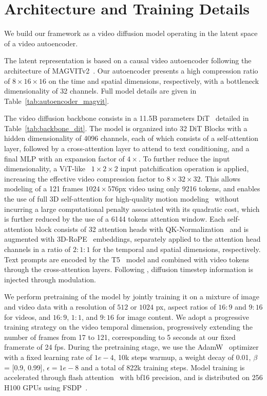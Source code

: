 \section{Architecture and Training Details}

We build our framework as a video diffusion model operating in the latent space of a video autoencoder.

The latent representation is based on a causal video autoencoder following the architecture of MAGVITv2~\cite{yu2024language}. Our autoencoder presents a high compression ratio of $8\times16\times16$ on the time and spatial dimensions, respectively, with a bottleneck dimensionality of 32 channels. Full model details are given in Table~\ref{tab:autoencoder_magvit}.

The video diffusion backbone consists in a 11.5B parameters DiT~\cite{Peebles2023DiT} detailed in Table~\ref{tab:backbone_dit}. The model is organized into 32 DiT Blocks with a hidden dimensionality of 4096 channels, each of which consists of a self-attention layer, followed by a cross-attention layer to attend to text conditioning, and a final MLP with an expansion factor of $4\times$. To further reduce the input dimensionality, a ViT-like~\cite{Dosovitskiy2021ViT} $1\times2\times2$ input patchification operation is applied, increasing the effective video compression factor to $8\times32\times32$. This allows modeling of a 121 frames $1024\times576$px video using only 9216 tokens, and enables the use of full 3D self-attention for high-quality motion modeling~\cite{polyak2024movie} without incurring a large computational penalty associated with its quadratic cost, which is further reduced by the use of a 6144 tokens attention window. Each self-attention block consists of 32 attention heads with QK-Normalization~\cite{EsserKSD3} and is augmented with 3D-RoPE~\cite{su2024roformer} embeddings, separately applied to the attention head channels in a ratio of $2:1:1$ for the temporal and spatial dimensions, respectively. Text prompts are encoded by the T5~\cite{raffel2020t5} model and combined with video tokens through the cross-attention layers. Following \cite{Peebles2023DiT}, diffusion timestep information is injected through modulation.

We perform pretraining of the model by jointly training it on a mixture of image and video data with a resolution of $512$ or $1024$ px, aspect ratios of $16:9$ and $9:16$ for videos, and $16:9$, $1:1$, and $9:16$ for image content. We adopt a progressive training strategy on the video temporal dimension, progressively extending the number of frames from 17 to 121, corresponding to 5 seconds at our fixed framerate of 24 fps. During the pretraining stage, we use the AdamW~\cite{loshchilov2018decoupled} optimizer with a fixed learning rate of $1e-4$, 10k steps warmup, a weight decay of 0.01, $\beta$ = [0.9, 0.99], $\epsilon=1e-8$ and a total of 822k training steps. Model training is accelerated through flash attention~\cite{dao2023flashattention2} with bf16 precision, and is distributed on 256 H100 GPUs using FSDP~\cite{zhao2023pytorchfsdpexperiencesscaling}.

